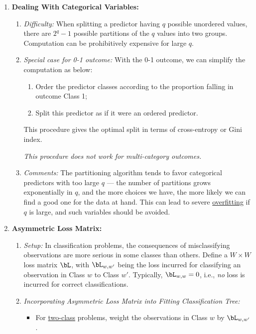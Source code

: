 \documentclass[12pt]{article}
\begin{document}
\begin{enumerate}[label=\textbf{\arabic*.}]

	\item \textbf{Dealing With Categorical Variables:} 
	\begin{enumerate}
		\item \textit{Difficulty:} When splitting a predictor having $q$ possible unordered values, there are $2^q-1$ possible partitions of the $q$ values into two groups. Computation can be prohibitively expensive for large $q$. 
		\item \textit{Special case for 0-1 outcome:} With the 0-1 outcome, we can simplify the computation as below: 
		\begin{enumerate}
			\item Order the predictor classes according to the proportion falling in outcome Class 1; 
			\item Split this predictor as if it were an ordered predictor. 
		\end{enumerate}
		This procedure gives the optimal split in terms of cross-entropy or Gini index. 
		
		\textit{This procedure does \emph{not} work for multi-category outcomes. }
		
		\item \textit{Comments:} The partitioning algorithm tends to favor categorical predictors with too large $q$ --- the number of partitions grows exponentially in $q$, and the more choices we have, the more likely we can find a good one for the data at hand. This can lead to severe \underline{overfitting} if $q$ is large, and such variables should be avoided. 
	\end{enumerate}
	
	\item \textbf{Asymmetric Loss Matrix:} 
	\begin{enumerate}
		\item \textit{Setup:} In classification problems, the consequences of misclassifying observations are more serious in some classes than others. Define a $W \times W$ loss matrix $\bL$, with $\bL_{w, w'}$ being the loss incurred for classifying an observation in Class $w$ to Class $w'$. Typically, $\bL_{w, w} = 0$, i.e., \emph{no} loss is incurred for correct classifications. 
		
		\item \textit{Incorporating Asymmetric Loss Matrix into Fitting Classification Tree:} 
		\begin{itemize}
			\item For \underline{two-class} problems, weight the observations in Class $w$ by $\bL_{w, w'}$. 
			

\end{itemize}
\end{enumerate}
\end{enumerate}
\end{document}
